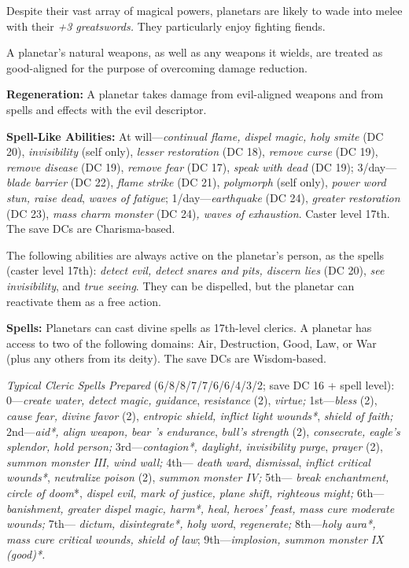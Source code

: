 \documentclass{article}
\begin{document}
Despite their vast array of magical powers, planetars are likely to wade into melee 
with their \textit{+3 greatswords. }They particularly enjoy fighting fiends.

A planetar's natural weapons, as well as any weapons it wields, are treated as 
good-aligned for the purpose of overcoming damage reduction.

\textbf{Regeneration:} A planetar takes damage from evil-aligned weapons and from 
spells and effects with the evil descriptor.

\textbf{Spell-Like Abilities:} At will---\textit{continual flame, dispel magic, 
holy smite }(DC 20), \textit{invisibility }(self only), \textit{lesser restoration 
}(DC 18), \textit{remove curse }(DC 19), \textit{remove disease }(DC 19), \textit{remove 
fear }(DC 17), \textit{speak with dead }(DC 19); 3/day---\textit{blade barrier 
}(DC 22), \textit{flame strike }(DC 21), \textit{polymorph }(self only), \textit{power 
word stun, raise dead}, \textit{waves of fatigue}; 1/day---\textit{earthquake }(DC 
24), \textit{greater restoration }(DC 23), \textit{mass charm monster }(DC 24)\textit{, 
waves of exhaustion}. Caster level 17th. The save DCs are Charisma-based.

The following abilities are always active on the planetar's person, as the spells 
(caster level 17th): \textit{detect evil, detect snares and pits, discern lies 
}(DC 20), \textit{see invisibility}, and \textit{true seeing}. They can be dispelled, 
but the planetar can reactivate them as a free action.

\textbf{Spells:} Planetars can cast divine spells as 17th-level clerics. A planetar 
has access to two of the following domains: Air, Destruction, Good, Law, or War 
(plus any others from its deity). The save DCs are Wisdom-based.

\textit{Typical Cleric Spells Prepared }(6/8/8/7/7/6/6/4/3/2; save DC 16 + spell 
level): 0---\textit{create water, detect magic, guidance}, \textit{resistance }(2), 
\textit{virtue; }1st---\textit{bless }(2), \textit{cause fear, divine favor }(2), 
\textit{entropic shield, inflict light wounds*}, \textit{shield of faith; }2nd---\textit{aid*, 
align weapon, bear 's endurance}, \textit{bull's strength }(2), \textit{consecrate, 
eagle's splendor, hold person; }3rd---\textit{contagion*, daylight, invisibility 
purge}, \textit{prayer }(2), \textit{summon monster III, wind wall; }4th--- \textit{death 
ward}, \textit{dismissal}, \textit{inflict critical wounds*}, \textit{neutralize 
poison }(2), \textit{summon monster IV; }5th--- \textit{break enchantment, circle 
of doom}*, \textit{dispel evil, mark of justice, plane shift, righteous might; 
}6th---\textit{banishment, greater dispel magic, harm*, heal, heroes' feast, mass 
cure moderate wounds; }7th--- \textit{dictum, disintegrate*, holy word}, \textit{regenerate; 
}8th---\textit{holy aura*, mass cure critical wounds, shield of law}; 9th---\textit{implosion, 
summon monster IX (good)*.}
\end{document}
